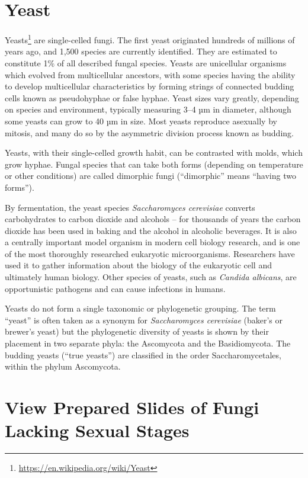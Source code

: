 \documentclass[]{book}
\let\rmarkdownfootnote\footnote%
\def\footnote{\protect\rmarkdownfootnote}
\renewcommand{\href}[2]{#2\footnote{\url{#1}}}
\theoremstyle{definition}
\theoremstyle{definition}
\theoremstyle{definition}
\theoremstyle{remark}
\begin{document}
\section{Yeast}\label{yeast}

\href{https://en.wikipedia.org/wiki/Yeast}{Yeasts} are single-celled
fungi. The first yeast originated hundreds of millions of years ago, and
1,500 species are currently identified. They are estimated to constitute
1\% of all described fungal species. Yeasts are unicellular organisms
which evolved from multicellular ancestors, with some species having the
ability to develop multicellular characteristics by forming strings of
connected budding cells known as pseudohyphae or false hyphae. Yeast
sizes vary greatly, depending on species and environment, typically
measuring 3--4 µm in diameter, although some yeasts can grow to 40 µm in
size. Most yeasts reproduce asexually by mitosis, and many do so by the
asymmetric division process known as budding.

Yeasts, with their single-celled growth habit, can be contrasted with
molds, which grow hyphae. Fungal species that can take both forms
(depending on temperature or other conditions) are called dimorphic
fungi (``dimorphic'' means ``having two forms'').

By fermentation, the yeast species \emph{Saccharomyces cerevisiae}
converts carbohydrates to carbon dioxide and alcohols -- for thousands
of years the carbon dioxide has been used in baking and the alcohol in
alcoholic beverages. It is also a centrally important model organism in
modern cell biology research, and is one of the most thoroughly
researched eukaryotic microorganisms. Researchers have used it to gather
information about the biology of the eukaryotic cell and ultimately
human biology. Other species of yeasts, such as \emph{Candida albicans},
are opportunistic pathogens and can cause infections in humans.

Yeasts do not form a single taxonomic or phylogenetic grouping. The term
``yeast'' is often taken as a synonym for \emph{Saccharomyces
cerevisiae} (baker's or brewer's yeast) but the phylogenetic diversity
of yeasts is shown by their placement in two separate phyla: the
Ascomycota and the Basidiomycota. The budding yeasts (``true yeasts'')
are classified in the order Saccharomycetales, within the phylum
Ascomycota.

\section{View Prepared Slides of Fungi Lacking Sexual
Stages}\label{view-the-prepared-slides-of-fungi-lacking-sexual-stages}
\end{document}

